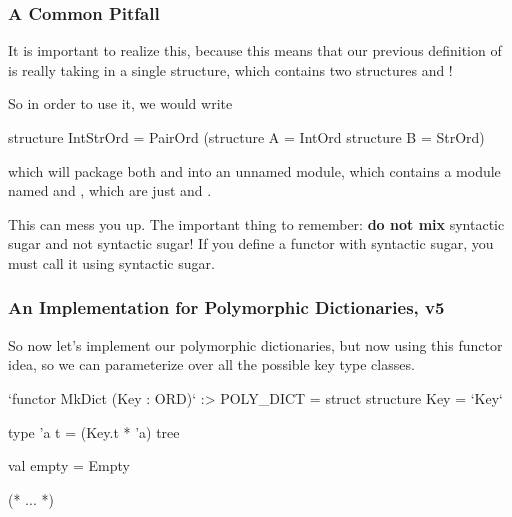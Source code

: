 \documentclass[aspectratio=169]{beamer}
\begin{document}
\begin{frame}[fragile]
  \frametitle{A Common Pitfall}

  It is important to realize this, because this means that our previous definition
  of  is really taking in a single structure, which contains two
  structures  and !

  \pause
  \vspace{\fill}

  So in order to use it, we would write
  \begin{codeblock}
    structure IntStrOrd = PairOrd (structure A = IntOrd
                                   structure B = StrOrd)
  \end{codeblock}

  which will package both  and  into an unnamed
  module, which contains a module named  and , which are just
   and .

  \pause
  \vspace{\fill}

  This can mess you up. The important thing to remember: \textbf{do not mix}
  syntactic sugar and not syntactic sugar! If you define a functor with syntactic
  sugar, you must call it using syntactic sugar.
\end{frame}

\begin{frame}[fragile]
  \frametitle{An Implementation for Polymorphic Dictionaries, v5}

  So now let's implement our polymorphic dictionaries, but now using this
  functor idea, so we can parameterize over all the possible key type classes.

  \pause
  \vspace{\fill}

  \begin{codeblock}
    `functor MkDict (Key : ORD)` :> POLY_DICT =
      struct
        structure Key = `Key`

        type 'a t = (Key.t * 'a) tree

        val empty = Empty

      (* ... *)
  \end{codeblock}
\end{frame}
\end{document}
